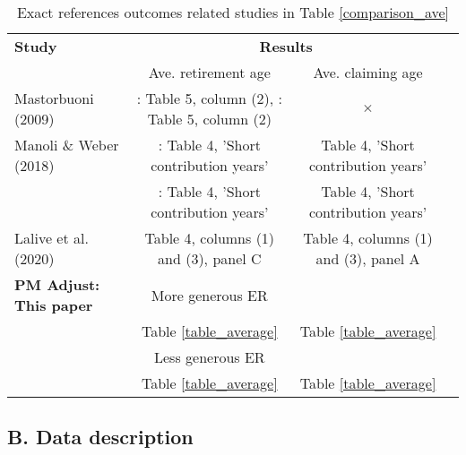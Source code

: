 \documentclass[12pt,a4paper]{article}
\begin{document}
\begin{sidewaystable}
		\footnotesize
		\caption{Exact references outcomes related studies in Table \ref{comparison_ave}}
		\label{comparison_ave_exact_references}
		\begin{tabular}{lccc}		
		
			\toprule
			
			\textbf{Study} & \multicolumn{2}{c}{\textbf{Results}} \\	
			
			&               Ave. retirement age & Ave. claiming age \\
			\midrule
			
			Mastorbuoni (2009) &
			\male: Table 5, column (2), \female: Table 5, column (2) &  $\times$ \\
			 
			Manoli \& Weber (2018) &
			\male: Table 4, 'Short contribution years' & Table 4, 'Short contribution years' \\
			& \female: Table 4, 'Short contribution years' & Table 4, 'Short contribution years' \\

			Lalive et al. (2020) & 
			Table 4, columns (1) and (3), panel C & Table 4, columns (1) and (3), panel A \\

			\textbf{PM Adjust: This paper} & More generous ER \\
			& Table \ref{table_average} & Table \ref{table_average} & \\
			& Less generous ER \\
			& Table \ref{table_average} & Table \ref{table_average} & \\

			\bottomrule		
		\end{tabular}
\end{sidewaystable}

\clearpage
\subsection*{B. Data description}\label{online_appendix_data}
\setcounter{table}{0}
\setcounter{equation}{0}
\setcounter{figure}{0}
\renewcommand{\thefigure}{B.\arabic{figure}}
\renewcommand{\thetable}{B.\arabic{table}}
\renewcommand{\theequation}{B.\arabic{equation}}
\end{document}
